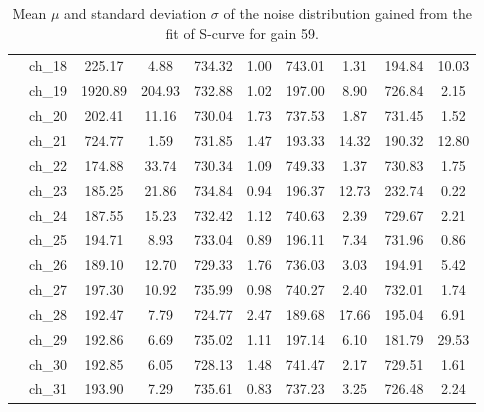 \begin{table}[H]
{\begin{tabular}{|c|c|c|c|c|c|c|c|c|c|}
    &ch\_18 & 225.17 & 4.88 & 734.32 & 1.00 & 743.01 & 1.31 & 194.84 & 10.03 \\
    &ch\_19 & 1920.89 & 204.93 & 732.88 & 1.02 & 197.00 & 8.90 & 726.84 & 2.15 \\
    &ch\_20 & 202.41 & 11.16 & 730.04 & 1.73 & 737.53 & 1.87 & 731.45 & 1.52 \\
    &ch\_21 & 724.77 & 1.59 & 731.85 & 1.47 & 193.33 & 14.32 & 190.32 & 12.80 \\
    &ch\_22 & 174.88 & 33.74 & 730.34 & 1.09 & 749.33 & 1.37 & 730.83 & 1.75 \\
    &ch\_23 & 185.25 & 21.86 & 734.84 & 0.94 & 196.37 & 12.73 & 232.74 & 0.22 \\
    &ch\_24 & 187.55 & 15.23 & 732.42 & 1.12 & 740.63 & 2.39 & 729.67 & 2.21 \\
    &ch\_25 & 194.71 & 8.93 & 733.04 & 0.89 & 196.11 & 7.34 & 731.96 & 0.86 \\
    &ch\_26 & 189.10 & 12.70 & 729.33 & 1.76 & 736.03 & 3.03 & 194.91 & 5.42 \\
    &ch\_27 & 197.30 & 10.92 & 735.99 & 0.98 & 740.27 & 2.40 & 732.01 & 1.74 \\
    &ch\_28 & 192.47 & 7.79 & 724.77 & 2.47 & 189.68 & 17.66 & 195.04 & 6.91 \\
    &ch\_29 & 192.86 & 6.69 & 735.02 & 1.11 & 197.14 & 6.10 & 181.79 & 29.53 \\
    &ch\_30 & 192.85 & 6.05 & 728.13 & 1.48 & 741.47 & 2.17 & 729.51 & 1.61 \\
    &ch\_31 & 193.90 & 7.29 & 735.61 & 0.83 & 737.23 & 3.25 & 726.48 & 2.24 \\
    \hline
     
\end{tabular}
}
\caption{Mean $\mu$ and standard deviation $\sigma$ of the noise distribution gained from the fit of S-curve for gain 59.}

\end{table}

